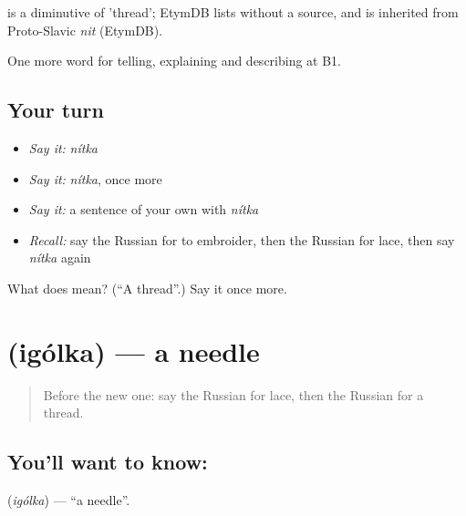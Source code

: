 \begin{cousinweb}
\emph{} is a diminutive of \emph{} 'thread'; EtymDB lists \emph{} without a source, and \emph{} is inherited from Proto-Slavic \emph{nit} (EtymDB).
\end{cousinweb}

\begin{grammarlens}[title={What you've built}]
One more word for telling, explaining and describing at B1.
\end{grammarlens}

\subsection*{Your turn}
\begin{itemize}
\raggedright
  \item \emph{Say it:} \emph{nítka}
  \item \emph{Say it:} \emph{nítka}, once more
  \item \emph{Say it:} a sentence of your own with \emph{nítka}
  \item \emph{Recall:} say the Russian for to embroider, then the Russian for lace, then say \emph{nítka} again
\end{itemize}

\begin{tcolorbox}[breakable,colback=teal!4,colframe=teal!35!black,title={Before you move on}]
What does  mean? (\textquotedblleft{}A thread\textquotedblright{}.) Say it once more.
\end{tcolorbox}
\section[\texorpdfstring{\ru{иголка} (igólka)}{иголка (igólka)}]{ (igólka) — a needle}

\label{lesson:RU-C501-igolka}



\begin{quote}
Before the new one: say the Russian for lace, then the Russian for a thread.
\end{quote}

\subsection*{You'll want to know: }
\textbf{} (\emph{igólka}) — \textquotedblleft{}a needle\textquotedblright{}.

